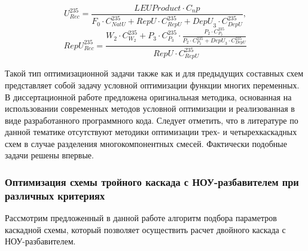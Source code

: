 \begin{equation} \label{Rec3} 
    U^{235}_{Rec} = \frac{LEU Product \cdot C_np}{F_0 \cdot C_{NatU}^{235} + RepU \cdot C_{RepU}^{235} + {DepU}_3 \cdot C_{DepU}^{235}}, 
\end{equation} 
\begin{equation} \label{RecR3} 
    RepU^{235}_{Rec} = \frac{W_2\cdot C_{W_2}^{235}+P_3\cdot C_{P_3}^{235}\cdot \frac{P_2\cdot C_{P_2}^{235}}{P_2\cdot C_{P_2}^{235}+ {DepU}_3 \cdot C_{DepU}^{235}}}{RepU \cdot C_{RepU}^{235}}        
\end{equation} 

Такой тип оптимизационной задачи также как и для предыдущих составных схем представляет собой задачу условной оптимизации функции многих переменных. В диссертационной работе предложена оригинальная методика, основанная на использовании современных методов условной оптимизации и реализованная в виде разработанного программного кода.
Следует отметить, что в литературе по данной тематике отсутствуют методики оптимизации трех- и четырехкаскадных схем в случае разделения многокомпонентных смесей. Фактически подобные задачи решены впервые.



\subsubsection{Оптимизация схемы тройного каскада с НОУ-разбавителем при различных критериях}


Рассмотрим предложенный в данной работе алгоритм подбора параметров каскадной схемы, который позволяет осуществить расчет двойного каскада с НОУ-разбавителем.

